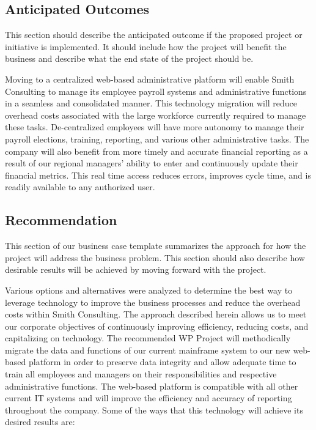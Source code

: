 \documentclass[11pt]{article}
\begin{document}
\subsection{Anticipated Outcomes}
\label{sec:org81b1d3b}
This section should describe the anticipated outcome if the proposed project or initiative is implemented. It should include how the project will benefit the business and describe what the end state of the project should be.

Moving to a centralized web-based administrative platform will enable Smith Consulting to manage its employee payroll systems and administrative functions in a seamless and consolidated manner. This technology migration will reduce overhead costs associated with the large workforce currently required to manage these tasks. De-centralized employees will have more autonomy to manage their payroll elections, training, reporting, and various other administrative tasks. The company will also benefit from more timely and accurate financial reporting as a result of our regional managers’ ability to enter and continuously update their financial metrics. This real time access reduces errors, improves cycle time, and is readily available to any authorized user.

\subsection{Recommendation}
\label{sec:orga0adc69}
This section of our business case template summarizes the approach for how the project will address the business problem. This section should also describe how desirable results will be achieved by moving forward with the project.

Various options and alternatives were analyzed to determine the best way to leverage technology to improve the business processes and reduce the overhead costs within Smith Consulting. The approach described herein allows us to meet our corporate objectives of continuously improving efficiency, reducing costs, and capitalizing on technology. The recommended WP Project will methodically migrate the data and functions of our current mainframe system to our new web-based platform in order to preserve data integrity and allow adequate time to train all employees and managers on their responsibilities and respective administrative functions. The web-based platform is compatible with all other current IT systems and will improve the efficiency and accuracy of reporting throughout the company. Some of the ways that this technology will achieve its desired results are:
\end{document}
